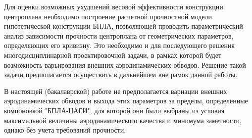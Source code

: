  




Для оценки возможных ухудшений весовой эффективности конструкции центроплана необходимо построение расчетной прочностной модели гипотетической конструкции БПЛА, позволяющей проводить параметрический анализ зависимости прочности центроплана от геометрических параметров, определяющих его кривизну. Это необходимо и для последующего решения многодисциплинарной проектировочной задачи, в рамках которой будет возможность варьирования внешних аэродинамических обводов. 
Решение такой задачи предполагается осуществить в дальнейшем вне рамок данной работы. 

В настоящей (бакалаврской) работе не предполагается вариации внешних аэродинамических обводов и выхода этих параметров за пределы, определенные компоновкой "БПЛА-ЦАГИ", для которой они были выбраны из условия максимальной величины аэродинамического качества и минимума заметности, однако без учета требований прочности. 





 
  
  

%

